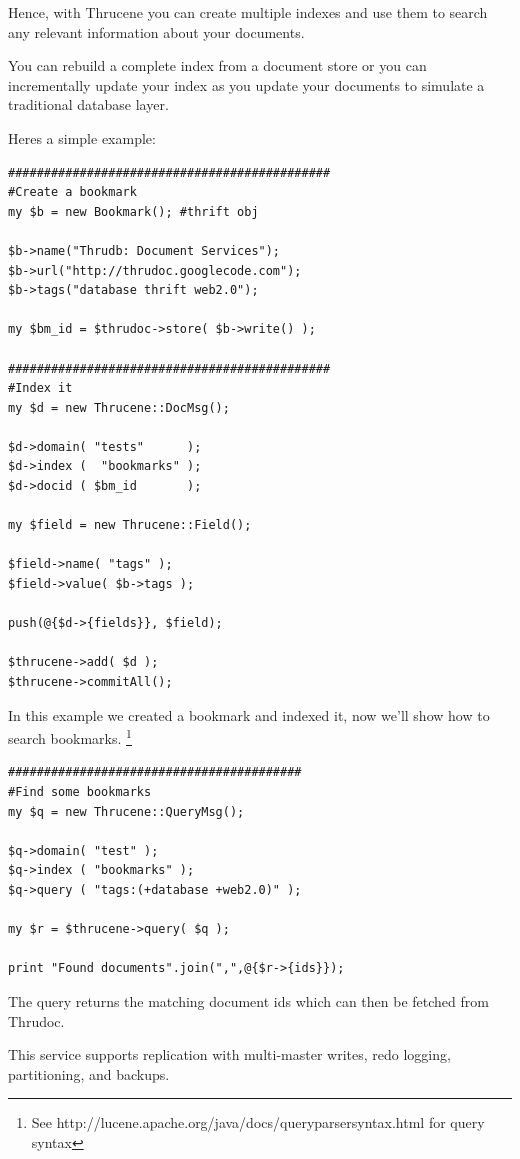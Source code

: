 \documentclass[nocopyrightspace,blockstyle]{sigplanconf}
\begin{document}
Hence, with Thrucene you can create multiple indexes and use them to search any relevant information about your documents.

You can rebuild a complete index from a document store or you can incrementally update your 
index as you update your documents to simulate a traditional database layer.

Heres a simple example:

\begin{verbatim}
#############################################
#Create a bookmark
my $b = new Bookmark(); #thrift obj

$b->name("Thrudb: Document Services");
$b->url("http://thrudoc.googlecode.com");
$b->tags("database thrift web2.0");

my $bm_id = $thrudoc->store( $b->write() );
  
#############################################
#Index it
my $d = new Thrucene::DocMsg();

$d->domain( "tests"      );
$d->index (  "bookmarks" );
$d->docid ( $bm_id       );

my $field = new Thrucene::Field();

$field->name( "tags" );
$field->value( $b->tags );

push(@{$d->{fields}}, $field);

$thrucene->add( $d );
$thrucene->commitAll();

\end{verbatim}

In this example we created a bookmark and indexed it, now we'll show how to search bookmarks.
\footnote{See http://lucene.apache.org/java/docs/queryparsersyntax.html for query syntax}

\begin{verbatim}
#########################################
#Find some bookmarks
my $q = new Thrucene::QueryMsg();

$q->domain( "test" );
$q->index ( "bookmarks" );
$q->query ( "tags:(+database +web2.0)" );
   
my $r = $thrucene->query( $q );

print "Found documents".join(",",@{$r->{ids}});

\end{verbatim}

The query returns the matching document ids which can then be 
fetched from Thrudoc.

This service supports replication with multi-master writes, redo logging, partitioning, and backups.
\end{document}
